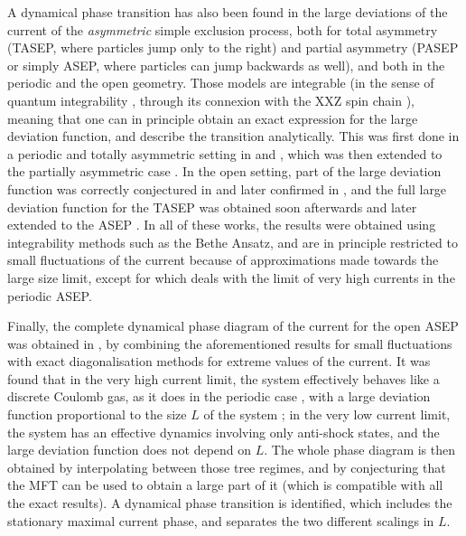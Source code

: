 \documentclass[aps,pre,onecolumn,showpacs,showkeys,a4paper]{revtex4-1}
\begin{document}
A dynamical phase transition has also been found in the large deviations of the current of the \textit{asymmetric} simple exclusion process, both for total asymmetry (TASEP, where particles jump only to the right) and partial asymmetry (PASEP or simply ASEP, where particles can jump backwards as well), and both in the periodic and the open geometry. Those models are integrable (in the sense of quantum integrability \cite{Faddeev1996,Lazarescu2014}, through its connexion with the XXZ spin chain \cite{sandow1994partially}), meaning that one can in principle obtain an exact expression for the large deviation function, and describe the transition analytically. This was first done in a periodic and totally asymmetric setting in \cite{derrida1998exact} and \cite{derrida1999universal}, which was then extended to the partially asymmetric case \cite{Prolhac2009,prolhac2010tree}. In the open setting, part of the large deviation function was correctly conjectured in \cite{Bodineau2006} and later confirmed in \cite{DeGier2011a}, and the full large deviation function for the TASEP was obtained soon afterwards \cite{Lazarescu2011} and later extended to the ASEP \cite{gorissen2012exact,Lazarescu2014}. In all of these works, the results were obtained using integrability methods such as the Bethe Ansatz, and are in principle restricted to small fluctuations of the current because of approximations made towards the large size limit, except for \cite{Popkov2010} which deals with the limit of very high currents in the periodic ASEP. 

Finally, the complete dynamical phase diagram of the current for the open ASEP was obtained in \cite{Lazarescu2013,Lazarescu2015}, by combining the aforementioned results for small fluctuations with exact diagonalisation methods for extreme values of the current. It was found that in the very high current limit, the system effectively behaves like a discrete Coulomb gas, as it does in the periodic case \cite{Popkov2010}, with a large deviation function proportional to the size $L$ of the system ; in the very low current limit, the system has an effective dynamics involving only anti-shock states, and the large deviation function does not depend on $L$. The whole phase diagram is then obtained by interpolating between those tree regimes, and by conjecturing that the MFT can be used to obtain a large part of it (which is compatible with all the exact results). A dynamical phase transition is identified, which includes the stationary maximal current phase, and separates the two different scalings in $L$.
\end{document}
